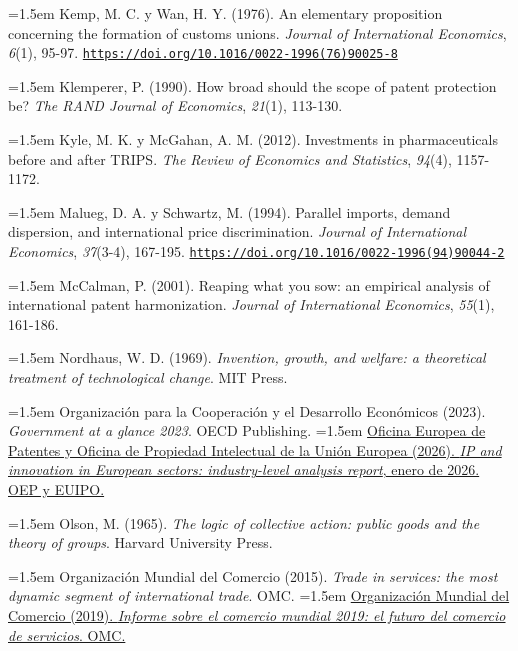\documentclass[10pt,a4paper]{article}
\begin{document}
\noindent\hangindent=1.5em Kemp, M. C. y Wan, H. Y. (1976). An elementary proposition concerning the formation of customs unions. \textit{Journal of International Economics}, \textit{6}(1), 95-97. \href{https://doi.org/10.1016/0022-1996(76)90025-8}{\nolinkurl{https://doi.org/10.1016/0022-1996(76)90025-8}}

\noindent\hangindent=1.5em Klemperer, P. (1990). How broad should the scope of patent protection be? \textit{The RAND Journal of Economics}, \textit{21}(1), 113-130.

\noindent\hangindent=1.5em Kyle, M. K. y McGahan, A. M. (2012). Investments in pharmaceuticals before and after TRIPS. \textit{The Review of Economics and Statistics}, \textit{94}(4), 1157-1172.

\noindent\hangindent=1.5em Malueg, D. A. y Schwartz, M. (1994). Parallel imports, demand dispersion, and international price discrimination. \textit{Journal of International Economics}, \textit{37}(3-4), 167-195. \href{https://doi.org/10.1016/0022-1996(94)90044-2}{\nolinkurl{https://doi.org/10.1016/0022-1996(94)90044-2}}

\noindent\hangindent=1.5em McCalman, P. (2001). Reaping what you sow: an empirical analysis of international patent harmonization. \textit{Journal of International Economics}, \textit{55}(1), 161-186.

\noindent\hangindent=1.5em Nordhaus, W. D. (1969). \textit{Invention, growth, and welfare: a theoretical treatment of technological change}. MIT Press.

\noindent\hangindent=1.5em Organización para la Cooperación y el Desarrollo Económicos (2023). \textit{Government at a glance 2023}. OECD Publishing.
\noindent\hangindent=1.5em \href{https://www.euipo.europa.eu/en/publications/ip-and-innovation-in-european-sectors}{Oficina Europea de Patentes y Oficina de Propiedad Intelectual de la Unión Europea (2026). \textit{IP and innovation in European sectors: industry-level analysis report}, enero de 2026. OEP y EUIPO.}

\noindent\hangindent=1.5em Olson, M. (1965). \textit{The logic of collective action: public goods and the theory of groups}. Harvard University Press.

\noindent\hangindent=1.5em Organización Mundial del Comercio (2015). \textit{Trade in services: the most dynamic segment of international trade}. OMC.
\noindent\hangindent=1.5em \href{https://www.wto.org/spanish/res_s/publications_s/wtr19_s.htm}{Organización Mundial del Comercio (2019). \textit{Informe sobre el comercio mundial 2019: el futuro del comercio de servicios}. OMC.}
\end{document}
